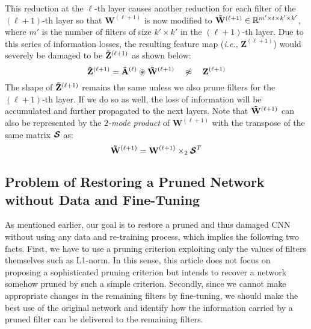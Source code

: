 This reduction at the $\ell$-th layer causes another reduction for each filter of the $(\ell+1)$-th layer so that $\mathbf{W}^{(\ell+1)}$ is now modified to $\mathbf{\Tilde{W}}^{(\ell+1)} \in \mathbb{R}^{m' \times t \times k' \times k'}$, where $m'$ is the number of filters of size $k' \times k'$ in the $(\ell+1)$-th layer. Due to this series of information losses, the resulting feature map (\textit{i.e.}, $\mathbf{Z}^{(\ell+1)}$) would severely be damaged to be $\mathbf{\Tilde{Z}}^{(\ell+1)}$ as shown below:
\begin{equation}
{\mathbf{\Tilde{Z}}}^{{(\ell+1)}} = \mathbf{\Tilde{A}}^{(\ell)} \circledast {\mathbf{\Tilde{W}}}^{(\ell+1)}~~~\not\approx~~~\mathbf{Z}^{(\ell+1)}
\label{eq:eq}\nonumber
\end{equation}
The shape of $\mathbf{\Tilde{Z}}^{(\ell+1)}$ remains the same unless we also prune filters for the $(\ell+1)$-th layer. If we do so as well, the loss of information will be accumulated and further propagated to the next layers. Note that $\mathbf{\Tilde{W}}^{(\ell+1)}$ can also be represented by the \textit{$2$-mode product} \cite{DBLP:journals/siamrev/KoldaB09} of $\mathbf{W}^{(\ell+1)}$ with the transpose of the same matrix $\boldsymbol{\S}$ as:
\begin{equation} \label{eq:pruning2}
\mathbf{\Tilde{W}}^{(\ell+1)} = {\mathbf{W}}^{(\ell+1)} \times_{2} {\boldsymbol{\S}^T}
\end{equation}




\subsection{Problem of Restoring a Pruned Network without Data and Fine-Tuning}
As mentioned earlier, our goal is to restore a pruned and thus damaged CNN without using any data and re-training process, which implies the following two facts. First, we have to use a pruning criterion exploiting only the values of filters themselves such as L1-norm. In this sense, this article does not focus on proposing a sophisticated pruning criterion but intends to recover a network somehow pruned by such a simple criterion. Secondly, since we cannot make appropriate changes in the remaining filters by fine-tuning, we should make the best use of the original network and identify how the information carried by a pruned filter can be delivered to the remaining filters.

